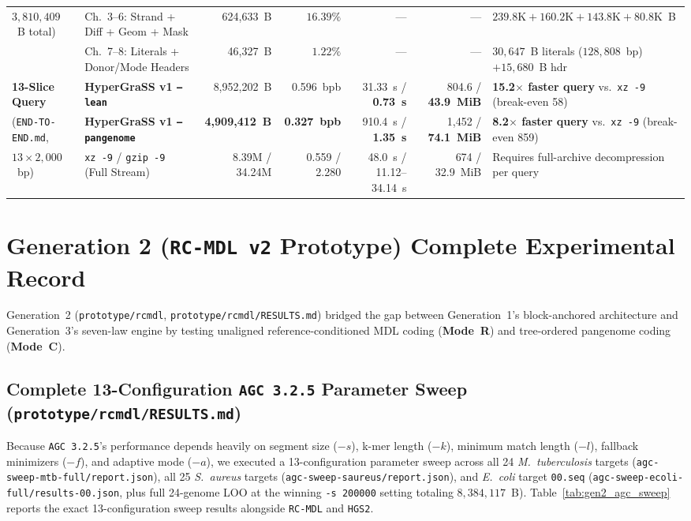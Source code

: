 \documentclass[10pt]{article}
\theoremstyle{definition}
\begin{document}
\begin{table}[h!]
{\begin{tabular}{llrrrrl}
$3,810,409$~B total) & Ch.~3--6: Strand + Diff + Geom + Mask & 624,633~B & $16.39\%$ & --- & --- & $239.8\text{K} + 160.2\text{K} + 143.8\text{K} + 80.8\text{K}$~B \\
 & Ch.~7--8: Literals + Donor/Mode Headers & 46,327~B & $1.22\%$ & --- & --- & $30,647$~B literals ($128,808$~bp) $+ 15,680$~B hdr \\
\midrule
\textbf{13-Slice Query} & \textbf{HyperGraSS v1 \texttt{--lean}} & 8,952,202~B & 0.596~bpb & 31.33~s / \textbf{0.73~s} & 804.6 / \textbf{43.9~MiB} & \textbf{15.2$\times$ faster query} vs.\ \texttt{xz -9} (break-even 58) \\
(\texttt{END-TO-END.md}, & \textbf{HyperGraSS v1 \texttt{--pangenome}} & \textbf{4,909,412~B} & \textbf{0.327~bpb} & 910.4~s / \textbf{1.35~s} & 1,452 / \textbf{74.1~MiB} & \textbf{8.2$\times$ faster query} vs.\ \texttt{xz -9} (break-even 859) \\
$13\times 2,000$~bp) & \texttt{xz -9} / \texttt{gzip -9} (Full Stream) & 8.39M / 34.24M & 0.559 / 2.280 & 48.0~s / 11.12--34.14~s & 674 / 32.9~MiB & Requires full-archive decompression per query \\
\bottomrule
\end{tabular}%
}
\end{table}

\section{Generation 2 (\texttt{RC-MDL v2} Prototype) Complete Experimental Record}

Generation~2 (\texttt{prototype/rcmdl}, \texttt{prototype/rcmdl/RESULTS.md}) bridged the gap between Generation~1's block-anchored architecture and Generation~3's seven-law engine by testing unaligned reference-conditioned MDL coding (\textbf{Mode~R}) and tree-ordered pangenome coding (\textbf{Mode~C}).

\subsection{Complete 13-Configuration \texttt{AGC 3.2.5} Parameter Sweep (\texttt{prototype/rcmdl/RESULTS.md})}

Because \texttt{AGC~3.2.5}'s performance depends heavily on segment size ($-s$), k-mer length ($-k$), minimum match length ($-l$), fallback minimizers ($-f$), and adaptive mode ($-a$), we executed a 13-configuration parameter sweep across all 24 \textit{M.~tuberculosis} targets (\texttt{agc-sweep-mtb-full/report.json}), all 25 \textit{S.~aureus} targets (\texttt{agc-sweep-saureus/report.json}), and \textit{E.~coli} target \texttt{00.seq} (\texttt{agc-sweep-ecoli-full/results-00.json}, plus full 24-genome LOO at the winning \texttt{-s 200000} setting totaling $8,384,117$~B). Table~\ref{tab:gen2_agc_sweep} reports the exact 13-configuration sweep results alongside \texttt{RC-MDL} and \texttt{HGS2}.
\end{document}
